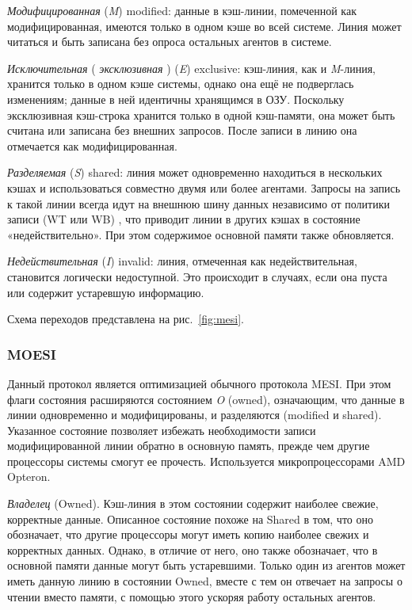 \begin{itemize*}
\item    \textit{Модифицированная} (\textit{M}) \abbr modified: данные в кэш-линии, помеченной как модифицированная, имеются только в одном кэше во всей системе. Линия может читаться и быть записана без опроса остальных агентов в системе.

\item    \textit{Исключительная} ( \textit{эксклюзивная} ) (\textit{E}) \abbr exclusive: кэш-линия, как и \textit{M}-линия, хранится только в одном кэше системы, однако она ещё не подверглась изменениям; данные в ней идентичны хранящимся в ОЗУ. Поскольку эксклюзивная кэш-строка хранится только в одной кэш-памяти, она может быть считана или записана без внешних запросов. После записи в линию она отмечается как модифицированная.

\item    \textit{Разделяемая} (\textit{S}) \abbr shared: линия может одновременно находиться в нес\-коль\-ких кэшах и использоваться совместно двумя или более агентами. Запросы на запись к такой линии  всегда идут на внешнюю шину данных независимо от политики записи (WT или WB) , что приводит линии в других кэшах в состояние «недействительно». При этом содержимое основной памяти также обновляется.

\item    \textit{Недействительная} (\textit{I}) \abbr invalid: линия, отмеченная как недействительная, становится логически недоступной. Это происходит в случаях, если она пуста или содержит устаревшую информацию. 

\end{itemize*}
Схема переходов представлена на рис.~\ref{fig:mesi}.

\subsubsection{MOESI}

Данный протокол является оптимизацией  обычного протокола MESI. При этом флаги состояния расширяются состоянием \textit{O} (\abbr owned), означающим, что данные в линии одновременно и модифицированы, и разделяются (modified и shared). Указанное состояние позволяет избежать необходимости записи модифицированной линии обратно в основную память, прежде чем другие процессоры системы смогут ее прочесть. Используется микропроцессорами AMD Opteron.
\begin{itemize*}
\item    \textit{Владелец} (Owned). Кэш-линия в этом состоянии содержит наиболее свежие, корректные данные. Описанное состояние похоже на Shared в том, что оно обозначает, что другие процессоры могут иметь копию наиболее свежих и корректных данных. Однако, в отличие от него, оно также обозначает, что в основной памяти данные могут быть устаревшими. Только один из агентов может иметь данную линию в состоянии Owned, вместе с тем он отвечает на запросы о чтении вместо памяти, с помощью этого ускоряя работу остальных агентов.
\end{itemize*}


